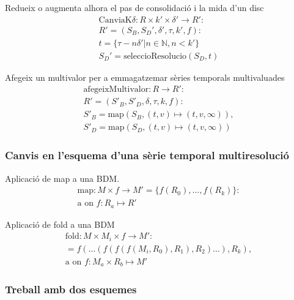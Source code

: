 Redueix o augmenta alhora el pas de consolidació i la mida d'un disc
  \begin{gather*}
    \text{CanviaK}\delta: R \times k' \times \delta' \longrightarrow R': \\
    R' = (S_B,S_D',\delta',\tau,k',f): \\    
    t = \{ \tau-n\delta' | n\in\mathbb{N},n<k' \} \\
    S_D' = \text{seleccioResolucio}(S_D,t)
  \end{gather*}




Afegeix un multivalor per a emmagatzemar sèries temporals multivaluades
  \begin{gather*}
    \text{afegeixMultivalor}: R \longrightarrow R': \\
    R' = (S'_{B},S'_{D},\delta,\tau,k,f): \\
    S'_{B} = \text{map}(S_B,(t,v)\mapsto(t,v,\infty)), \\
    S'_{D} = \text{map}(S_D,(t,v)\mapsto(t,v,\infty))
  \end{gather*}




\subsubsection{Canvis en l'esquema d'una sèrie temporal multiresolució}

Aplicació de map a una BDM.
\begin{gather*}
  \text{map}: M \times f \longrightarrow M' = \{ f(R_0), \dotsc, f(R_k) \} :\\
   \text{a on } f: R_a \mapsto R'
 \end{gather*}
 
Aplicació de fold a una BDM
\begin{gather*}
  \text{fold}: M \times M_i \times f \longrightarrow M' :\\
  = f(\dots(f(f(f(M_i,R_0),R_1),R_2)\dots),R_k), \\
   \text{a on } f: M_a \times R_b \mapsto M'
\end{gather*}





\subsubsection{Treball amb dos esquemes}


